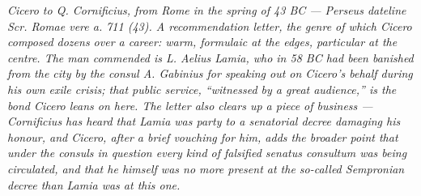
\textit{Cicero to Q. Cornificius, from Rome in the spring of 43 BC ---
Perseus dateline \textit{Scr. Romae vere a. 711 (43)}. A recommendation
letter, the genre of which Cicero composed dozens over a career: warm,
formulaic at the edges, particular at the centre. The man commended is
L. Aelius Lamia, who in 58 BC had been banished from the city by the
consul A. Gabinius for speaking out on Cicero's behalf during his own
exile crisis; that public service, ``witnessed by a great audience,'' is
the bond Cicero leans on here. The letter also clears up a piece of
business --- Cornificius has heard that Lamia was party to a senatorial
decree damaging his honour, and Cicero, after a brief vouching for him,
adds the broader point that under the consuls in question every kind of
falsified senatus consultum was being circulated, and that he himself was
no more present at the so-called Sempronian decree than Lamia was at
this one.}
